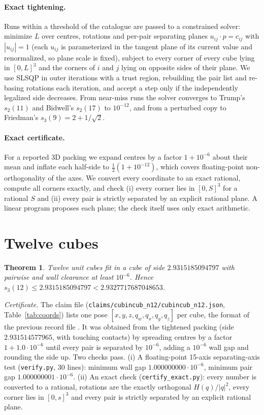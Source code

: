 \documentclass[11pt]{article}
\newtheorem{theorem}{Theorem}
\begin{document}
\paragraph{Exact tightening.} Runs within a threshold of the catalogue are passed to a constrained solver: minimize $L$ over centres, rotations and per-pair separating planes $u_{ij}\cdot p=c_{ij}$ with $|u_{ij}|=1$ (each $u_{ij}$ is parameterized in the tangent plane of its current value and renormalized, so plane scale is fixed), subject to every corner of every cube lying in $[0,L]^3$ and the corners of $i$ and $j$ lying on opposite sides of their plane. We use SLSQP \cite{kraft} in outer iterations with a trust region, rebuilding the pair list and re-basing rotations each iteration, and accept a step only if the independently legalized side decreases. From near-miss runs the solver converges to Trump's $s_2(11)$ \cite{trump} and Bidwell's $s_2(17)$ \cite{friedmansurvey} to $10^{-12}$, and from a perturbed copy to Friedman's $s_3(9)=2+1/\sqrt2$.

\paragraph{Exact certificate.} For a reported 3D packing we expand centres by a factor $1+10^{-6}$ about their mean and inflate each half-side to $\tfrac12(1+10^{-12})$, which covers floating-point non-orthogonality of the axes. We convert every coordinate to an exact rational, compute all corners exactly, and check (i) every corner lies in $[0,S]^3$ for a rational $S$ and (ii) every pair is strictly separated by an explicit rational plane. A linear program proposes each plane; the check itself uses only exact arithmetic.

\section{Twelve cubes}\label{sec:record}
\begin{theorem}
Twelve unit cubes fit in a cube of side $2.9315185094797$ with pairwise and wall clearance at least $10^{-6}$. Hence $s_3(12)\le 2.9315185094797<2.9327717687048653$.
\end{theorem}
\noindent\emph{Certificate.} The claim file (\texttt{claims/cubincub\_n12/cubincub\_n12.json}, Table~\ref{tab:coords}) lists one pose $[x,y,z,q_w,q_x,q_y,q_z]$ per cube, the format of the previous record file \cite{hyra}. It was obtained from the tightened packing (side $2.931514577965$, with touching contacts) by spreading centres by a factor $1+1.0\cdot10^{-6}$ until every pair is separated by $10^{-6}$, adding a $10^{-6}$ wall gap and rounding the side up. Two checks pass. (i) A floating-point 15-axis separating-axis test (\texttt{verify.py}, 30 lines): minimum wall gap $1.000000000\cdot10^{-6}$, minimum pair gap $1.000000001\cdot10^{-6}$. (ii) An exact check (\texttt{certify\_exact.py}): every number is converted to a rational, rotations are the exactly orthogonal $H(q)/|q|^2$, every corner lies in $[0,s]^3$ and every pair is strictly separated by an explicit rational plane.
\end{document}
